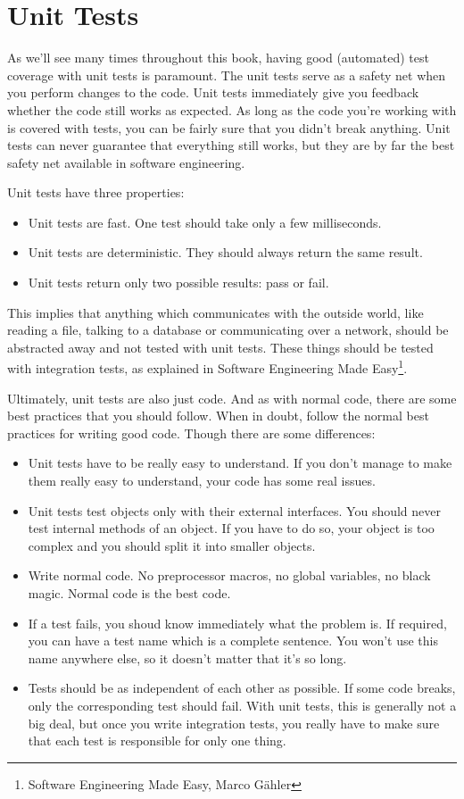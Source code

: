 
\section{Unit Tests}

As we'll see many times throughout this book, having good (automated) test coverage with unit tests is paramount. The unit tests serve as a safety net when you perform changes to the code. Unit tests immediately give you feedback whether the code still works as expected. As long as the code you're working with is covered with tests, you can be fairly sure that you didn't break anything. Unit tests can never guarantee that everything still works, but they are by far the best safety net available in software engineering.

Unit tests have three properties:
\begin{itemize}
    \item Unit tests are fast. One test should take only a few milliseconds.
    \item Unit tests are deterministic. They should always return the same result.
    \item Unit tests return only two possible results: pass or fail.
\end{itemize}

This implies that anything which communicates with the outside world, like reading a file, talking to a database or communicating over a network, should be abstracted away and not tested with unit tests. These things should be tested with integration tests, as explained in Software Engineering Made Easy\footnote{Software Engineering Made Easy, Marco Gähler}.

Ultimately, unit tests are also just code. And as with normal code, there are some best practices that you should follow. When in doubt, follow the normal best practices for writing good code. Though there are some differences:
\begin{itemize}
    \item Unit tests have to be really easy to understand. If you don't manage to make them really easy to understand, your code has some real issues.
    \item Unit tests test objects only with their external interfaces. You should never test internal methods of an object. If you have to do so, your object is too complex and you should split it into smaller objects.
    \item Write normal code. No preprocessor macros, no global variables, no black magic. Normal code is the best code.
    \item If a test fails, you shoud know immediately what the problem is. If required, you can have a test name which is a complete sentence. You won't use this name anywhere else, so it doesn't matter that it's so long.
    \item Tests should be as independent of each other as possible. If some code breaks, only the corresponding test should fail. With unit tests, this is generally not a big deal, but once you write integration tests, you really have to make sure that each test is responsible for only one thing.
\end{itemize}

